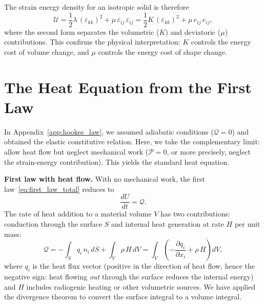 \documentclass[11pt]{article}
\begin{document}
\medskip
\noindent The strain energy density for an isotropic solid is therefore
\begin{equation}
  \mathcal{U} = \frac{1}{2}\lambda\,(\varepsilon_{kk})^2 + \mu\,\varepsilon_{ij}\,\varepsilon_{ij} = \frac{1}{2}K\,(\varepsilon_{kk})^2 + \mu\,e_{ij}\,e_{ij},
  \label{eq:strain_energy_isotropic}
\end{equation}
where the second form separates the volumetric ($K$) and deviatoric ($\mu$) contributions.  This confirms the physical interpretation: $K$ controls the energy cost of volume change, and $\mu$ controls the energy cost of shape change.

\clearpage
\section{The Heat Equation from the First Law}
\label{app:heat_equation}

In Appendix~\ref{app:hookes_law}, we assumed adiabatic conditions ($\mathcal{Q} = 0$) and obtained the elastic constitutive relation.  Here, we take the complementary limit: allow heat flow but neglect mechanical work ($\mathcal{P} = 0$, or more precisely, neglect the strain-energy contribution).  This yields the standard heat equation.

\medskip
\noindent\textbf{First law with heat flow.}  With no mechanical work, the first law~\eqref{eq:first_law_total} reduces to
\begin{equation}
  \frac{dU}{dt} = \mathcal{Q}.
  \label{eq:first_law_heat}
\end{equation}
The rate of heat addition to a material volume $V$ has two contributions: conduction through the surface $S$ and internal heat generation at rate $H$ per unit mass:
\begin{equation}
  \mathcal{Q} = -\int_S q_i\,n_i\,dS + \int_V \rho\,H\,dV = \int_V \left(-\frac{\partial q_i}{\partial x_i} + \rho\,H\right)dV,
  \label{eq:heat_addition}
\end{equation}
where $q_i$ is the heat flux vector (positive in the direction of heat flow, hence the negative sign: heat flowing \textit{out} through the surface reduces the internal energy) and $H$ includes radiogenic heating or other volumetric sources.  We have applied the divergence theorem to convert the surface integral to a volume integral.
\end{document}
